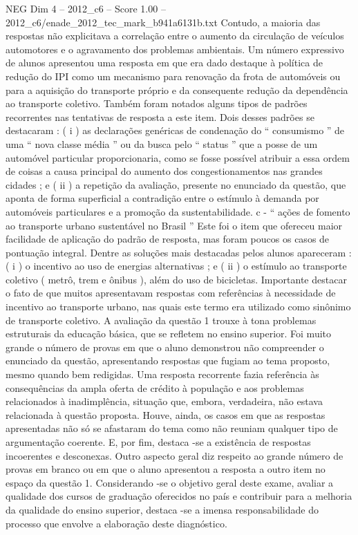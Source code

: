 \begin{textsample}{NEG Dim 4 – 2012\_c6 – Score 1.00 – 2012\_c6/enade\_2012\_tec\_mark\_b941a6131b.txt}
Contudo, a maioria das respostas não explicitava a correlação entre o aumento da circulação de veículos automotores e o agravamento dos problemas ambientais.
Um número expressivo de alunos apresentou uma resposta em que era dado destaque à política de redução do IPI como um mecanismo para renovação da frota de automóveis ou para a aquisição do transporte próprio e da consequente redução da dependência ao transporte coletivo.
Também foram notados alguns tipos de padrões recorrentes nas tentativas de resposta a este item.
Dois desses padrões se destacaram : ( i ) as declarações genéricas de condenação do “ consumismo ” de uma “ nova classe média ” ou da busca pelo “ status ” que a posse de um automóvel particular proporcionaria, como se fosse possível atribuir a essa ordem de coisas a causa principal do aumento dos congestionamentos nas grandes cidades ; e ( ii ) a repetição da avaliação, presente no enunciado da questão, que aponta de forma superficial a contradição entre o estímulo à demanda por automóveis particulares e a promoção da sustentabilidade. c - “ ações de fomento ao transporte urbano sustentável no Brasil ” Este foi o item que ofereceu maior facilidade de aplicação do padrão de resposta, mas foram poucos os casos de pontuação integral.
Dentre as soluções mais destacadas pelos alunos apareceram : ( i ) o incentivo ao uso de energias alternativas ; e ( ii ) o estímulo ao transporte coletivo ( metrô, trem e ônibus ), além do uso de bicicletas.
Importante destacar o fato de que muitos apresentavam respostas com referências à necessidade de incentivo ao transporte urbano, nas quais este termo era utilizado como sinônimo de transporte coletivo.
A avaliação da questão 1 trouxe à tona problemas estruturais da educação básica, que se refletem no ensino superior.
Foi muito grande o número de provas em que o aluno demonstrou não compreender o enunciado da questão, apresentando respostas que fugiam ao tema proposto, mesmo quando bem redigidas.
Uma resposta recorrente fazia referência às consequências da ampla oferta de crédito à população e aos problemas relacionados à inadimplência, situação que, embora, verdadeira, não estava relacionada à questão proposta.
Houve, ainda, os casos em que as respostas apresentadas não só se afastaram do tema como não reuniam qualquer tipo de argumentação coerente.
E, por fim, destaca -se a existência de respostas incoerentes e desconexas.
Outro aspecto geral diz respeito ao grande número de provas em branco ou em que o aluno apresentou a resposta a outro item no espaço da questão 1.
Considerando -se o objetivo geral deste exame, avaliar a qualidade dos cursos de graduação oferecidos no país e contribuir para a melhoria da qualidade do ensino superior, destaca -se a imensa responsabilidade do processo que envolve a elaboração deste diagnóstico.

\end{textsample}
